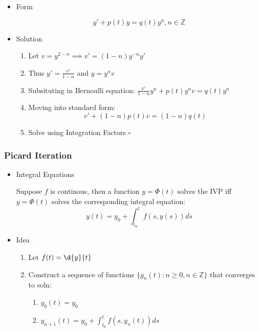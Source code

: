\documentclass[11pt]{article}
\begin{document}
\begin{itemize}

\item Form\\
\label{sec-9.1.3.1}

     \begin{equation}
     y'+p(t)y=q(t)y^n, n\in \mathbb{Z}
     \end{equation}

\item Solution\\
\label{sec-9.1.3.2}

\begin{enumerate}
\item Let $v=y^{2-n} \implies v'=(1-n)y^{-n}y'$
\item Thus $y'=\frac{v'}{1-n}$ and $y = y^n v$
\item Subsituting in Bernoulli equation: $\frac{v'}{1-n}y^n+p(t)y^nv=q(t)y^n$
\item Moving into standard form: 
        \begin{equation}
        v'+(1-n)p(t)v=(1-n)q(t)
        \end{equation}
\item Solve using Integration Factors $\square$
\end{enumerate}
\end{itemize} %
\subsubsection{Picard Iteration}
\label{sec-9.1.4}

\begin{itemize}

\item Integral Equations\\
\label{sec-9.1.4.1}

     Suppose $f$ is continous, then a function $y=\Phi(t)$
     solves the IVP iff $y=\Phi(t)$ solves the corresponding integral equation:
     \begin{equation}
     y(t)=y_0+\int_{t_0}^t f(s,y(s))ds
     \end{equation}

\item Idea\\
\label{sec-9.1.4.2}

\begin{enumerate}
\item Let $f(t) = \d{y}{t}$
\item Construct a sequence of functions $\{g_n(t) : n \geq 0, n\in \mathbb{Z}\}$ that converges to soln:

\begin{enumerate}
\item $y_0(t) = y_0$
\item $y_{n+1}(t)=y_0+ \int_{t_0}^tf(s,y_n(t))ds$
\end{enumerate}

\end{enumerate}
\end{itemize} %
\end{document}
